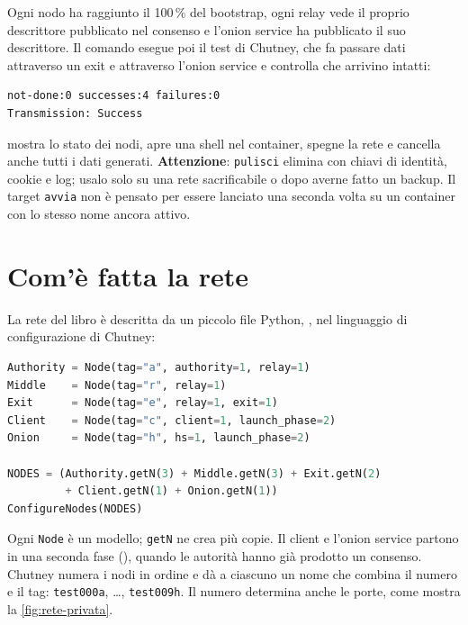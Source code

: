Ogni nodo ha raggiunto il 100\,\% del bootstrap, ogni relay vede il proprio descrittore pubblicato nel consenso e l'onion service ha pubblicato il suo descrittore. Il comando  esegue poi il test di Chutney, che fa passare dati attraverso un exit e attraverso l'onion service e controlla che arrivino intatti:
\begin{lstlisting}[numbers=none]
  not-done:0 successes:4 failures:0
Transmission: Success
\end{lstlisting}

 mostra lo stato dei nodi,  apre una shell nel container,  spegne la rete e  cancella anche tutti i dati generati. \textbf{Attenzione}: \texttt{pulisci} elimina  con chiavi di identità, cookie e log; usalo solo su una rete sacrificabile o dopo averne fatto un backup. Il target \texttt{avvia} non è pensato per essere lanciato una seconda volta su un container con lo stesso nome ancora attivo.

\section{Com'è fatta la rete}\label{sec:rp-topologia}

La rete del libro è descritta da un piccolo file Python, , nel linguaggio di configurazione di Chutney:
\begin{lstlisting}[language=Python]
Authority = Node(tag="a", authority=1, relay=1)
Middle    = Node(tag="r", relay=1)
Exit      = Node(tag="e", relay=1, exit=1)
Client    = Node(tag="c", client=1, launch_phase=2)
Onion     = Node(tag="h", hs=1, launch_phase=2)

NODES = (Authority.getN(3) + Middle.getN(3) + Exit.getN(2)
         + Client.getN(1) + Onion.getN(1))
ConfigureNodes(NODES)
\end{lstlisting}

Ogni \texttt{Node} è un modello; \texttt{getN} ne crea più copie. Il client e l'onion service partono in una seconda fase (), quando le autorità hanno già prodotto un consenso. Chutney numera i nodi in ordine e dà a ciascuno un nome che combina il numero e il tag: \texttt{test000a}, \ldots, \texttt{test009h}. Il numero determina anche le porte, come mostra la \cref{fig:rete-privata}.

